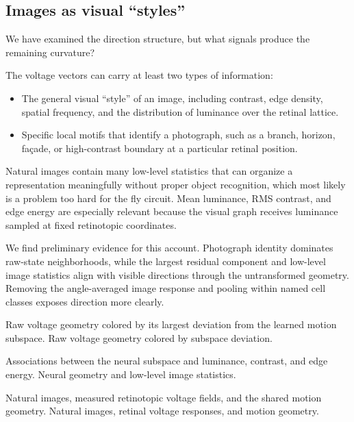 \documentclass[11pt]{article}
\begin{document}
\subsection{Images as visual ``styles''}

We have examined the direction structure, but what signals produce the remaining curvature?

The voltage vectors can carry at least two types of information:

\begin{itemize}
\tightlist
\item The general visual ``style'' of an image, including contrast, edge density, spatial frequency, and the distribution of luminance over the retinal lattice.
\item Specific local motifs that identify a photograph, such as a branch, horizon, façade, or high-contrast boundary at a particular retinal position.
\end{itemize}

Natural images contain many low-level statistics that can organize a representation meaningfully without proper object recognition, which most likely is a problem too hard for the fly circuit. Mean luminance, RMS contrast, and edge energy are especially relevant because the visual graph receives luminance sampled at fixed retinotopic coordinates.

We find preliminary evidence for this account. Photograph identity dominates raw-state neighborhoods, while the largest residual component and low-level image statistics align with visible directions through the untransformed geometry. Removing the angle-averaged image response and pooling within named cell classes exposes direction more clearly.

  {Raw voltage geometry colored by its largest deviation from the learned motion subspace.}
  {Raw voltage geometry colored by subspace deviation.}

  {Associations between the neural subspace and luminance, contrast, and edge energy.}
  {Neural geometry and low-level image statistics.}

  {Natural images, measured retinotopic voltage fields, and the shared motion geometry.}
  {Natural images, retinal voltage responses, and motion geometry.}
\end{document}
